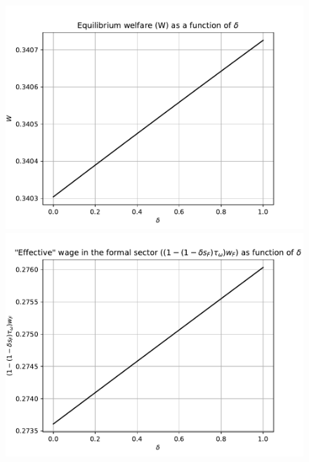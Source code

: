 \documentclass[12pt]{article}
\begin{document}
\begin{figure}\ContinuedFloat
    \centering
    \includegraphics[scale = 0.9]{figures/welfare.pdf}
    \includegraphics[scale = 0.9]{figures/effective.pdf}
\end{figure}





\end{document}
